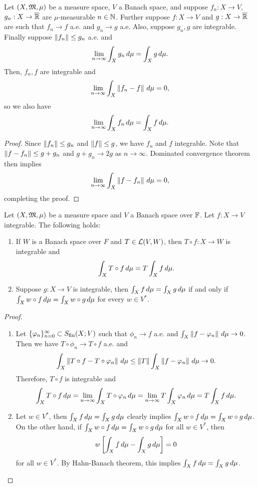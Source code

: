 \documentclass[a4paper]{article}
\renewcommand{\seqinfn}[1]{\{ #1 \}_{n=0}^\infty}
\begin{document}
\begin{thm}
Let $(X, \mathfrak{M}, \mu)$ be a measure space, $V$ a Banach space,
and suppose $f_n : X \to V$, $g_n : X \to \overline{\mathbb{R}}$ are
$\mu$-measurable $n \in \mathbb{N}$. Further suppose
$f: X \to V$ and $g: X \to \overline{\mathbb{R}}$ are such that
$f_n \to f$ a.e. and $g_n \to g$ a.e.
Also, suppose $g_n, g$ are integrable.
Finally suppose
$\left\lVert f_n\right\rVert \leq g_n$ a.e. and
\[
\lim_{n \to \infty} \int_X g_n \, d \mu = \int_X g \, d \mu.
\]
Then, $f_n, f$ are integrable and
\[
\lim_{n \to \infty} \int_X \left\lVert f_n - f\right\rVert \, d \mu = 0,
\]
so we also have
\[
\lim_{n \to \infty} \int_X f_n \, d \mu = \int_X f \, d \mu.
\]
\end{thm}

\begin{proof}
Since $\left\lVert f_n\right\rVert \leq g_n$ and $\left\lVert f\right\rVert \leq g$,
we have $f_n$ and $f$ integrable. Note that
$\left\lVert f - f_n\right\rVert \leq g + g_n$ and $g + g_n \to 2g$
as $n \to \infty$. Dominated convergence theorem then implies
\[
\lim_{n \to \infty} \int_X \left\lVert f - f_n\right\rVert \, d \mu = 0,
\]
completing the proof.
\end{proof}

\begin{prop}
Let $(X, \mathfrak{M}, \mu)$ be a measure space and $V$ a Banach
space over $\mathbb{F}$.
Let $f : X \to V$ integrable. The following holds:
\begin{enumerate}
\item If $W$ is a Banach space over $F$ and $T \in \mathcal{L}(V, W)$,
then $T \circ f: X \to W$ is integrable and
\[
\int_X T \circ f \, d \mu = T \int_X f \, d \mu.
\]

\item Suppose $g : X \to V$ is integrable, then
$\int_X f \, d \mu = \int_X g \, d \mu$ if and only if
$\int_X w \circ f \, d \mu = \int_X w \circ g \, d \mu$
for every $w \in V^*$.
\end{enumerate}
\end{prop}

\begin{proof}
\begin{enumerate}
\item Let $\seqinfn{\phi_n} \subset \Sfin(X ; V)$ such that
$\phi_n \to f$ a.e. and $\int_X \left\lVert f - \varphi_n\right\rVert \, d \mu \to 0$.
Then we have $T \circ \phi_n \to T \circ f$ a.e. and
\[
\int_X \left\lVert T \circ f - T \circ \varphi_n\right\rVert \, d \mu
\leq \left\lVert T\right\rVert \int_X \left\lVert f - \varphi_n\right\rVert \, d \mu \to 0.
\]
Therefore, $T \circ f$ is integrable and
\[
\int_X T \circ f \, d \mu = \lim_{n \to \infty}
\int_X T \circ \varphi_n \, d \mu
= \lim_{n \to \infty} T \int_X \varphi_n \, d \mu
= T \int_X f \, d \mu.
\]

\item Let $w \in V^*$, then $\int_X f \, d \mu = \int_X g \, d \mu$
clearly implies $\int_X w \circ f \, d \mu = \int_X w \circ g
\, d \mu$. On the other hand, if $\int_X w \circ f \, d \mu = \int_X
w \circ g \, d \mu$ for all $w \in V^*$, then
\[
w \left[ \int_X f \, d \mu - \int_X g \, d \mu \right] = 0
\]
for all $w \in V^*$. By Hahn-Banach theorem,
this implies $\int_X f \, d \mu = \int_X g \, d \mu$.
\end{enumerate}
\end{proof}
\end{document}
